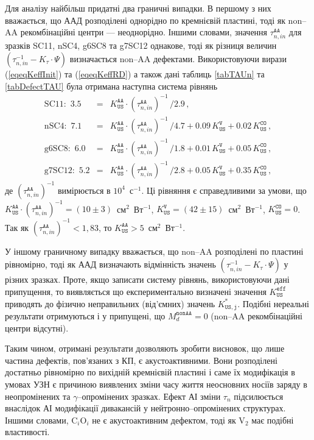 Для аналізу найбільш придатні два граничні випадки.
В першому з них вважається,
що ААД розподілені однорідно по кремнієвій пластині, тоді як
non--AA рекомбінаційні центри --- неоднорідно.
Іншими словами,
значення $\tau_{n,in}^\mathtt{AA}$ для зразків SC11, nSC4, g6SC8 та g7SC12
однакове, тоді як різниця величин
$(\tau_{n,in}^{-1}-K_\tau\cdot\Psi)$ визначається non--AA дефектами.
Використовуючи вирази (\ref{eqeqKeffInit}) та (\ref{eqeqKeffRD}) а також
дані таблиць \ref{tabTAUn} та \ref{tabDefectTAU}
була отримана наступна система рівнянь
\begin{eqnarray}
\mbox{SC11}:\,\,3.5&=&K_\mathtt{US}^\mathtt{AA}\cdot(\tau_{n,in}^\mathtt{AA})^{-1}\,/2.9\,,\nonumber\\
\mbox{nSC4}:\,\,7.1&=&K_\mathtt{US}^\mathtt{AA}\cdot(\tau_{n,in}^\mathtt{AA})^{-1}\,/4.7+0.09\,K_\mathtt{US}^\mathtt{V}+0.02\,K_\mathtt{US}^\mathtt{CO}\,,\nonumber\\
\mbox{g6SC8}:\,\,6.0&=&K_\mathtt{US}^\mathtt{AA}\cdot(\tau_{n,in}^\mathtt{AA})^{-1}\,/1.8+0.01\,K_\mathtt{US}^\mathtt{V}+0.05\,K_\mathtt{US}^\mathtt{CO}\,,\nonumber\\
\mbox{g7SC12}:\,\,5.2&=&K_\mathtt{US}^\mathtt{AA}\cdot(\tau_{n,in}^\mathtt{AA})^{-1}\,/2.8+0.05\,K_\mathtt{US}^\mathtt{V}+0.35\,K_\mathtt{US}^\mathtt{CO}\,,\nonumber
\end{eqnarray}
де
$(\tau_{n,in}^\mathtt{AA})^{-1}$ вимірюється в $10^4$~с$^{-1}$.
Ці рівняння є справедливими за умови, що
$K_\mathtt{US}^\mathtt{AA}\cdot(\tau_{n,in}^\mathtt{AA})^{-1}=(10\pm3)$~см$^2$~Вт$^{-1}$,
$K_\mathtt{US}^\mathtt{V}=(42\pm15)$~см$^2$~Вт$^{-1}$,
$K_\mathtt{US}^\mathtt{CO}=0$.
Так як  $(\tau_{n,in}^\mathtt{AA})^{-1}<1,83$,
то $K_\mathtt{US}^\mathtt{AA}>5$~см$^2$~Вт$^{-1}$.

У іншому граничному випадку вважається,
що non--AA розподілені по пластині рівномірно,
тоді як ААД визначають відмінність значень $(\tau_{n,in}^{-1}-K_\tau\cdot\Psi)$ у різних зразках.
Проте, якщо записати систему рівнянь, використовуючи дані припущення,
то виявляється що експериментально визначені значення $K_\mathtt{US}^\mathtt{eff}$
приводять до фізично неправильних (від'ємних) значень $K_\mathtt{US,j}^*$.
Подібні нереальні результати отримуються і у припущені, що $M_d^\mathtt{nonAA}=0$
(non--AA рекомбінаційні центри відсутні).

Таким чином, отримані результати дозволяють зробити висновок,
що лише частина дефектів, пов'язаних з КП, є акустоактивними.
Вони розподілені достатньо рівномірно по вихідній кремнієвій пластині і саме їх модифікація
в умовах УЗН є причиною виявлених зміни часу життя неосновних носіїв заряду в неопромінених та $\gamma$--опромінених зразках.
Ефект АІ зміни $\tau_n$ підсилюється внаслідок АІ модифікації дивакансій у нейтронно--опромінених структурах.
Іншими словами,
C$_i$O$_i$ не є акустоактивним дефектом, тоді як V$_2$ має подібні властивості.



